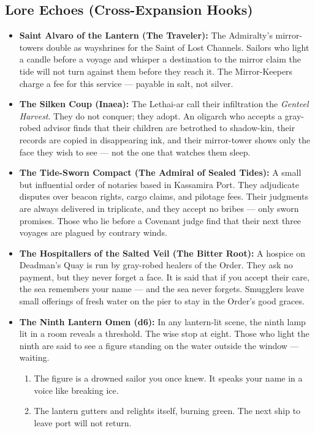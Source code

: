 \subsection*{Lore Echoes (Cross-Expansion Hooks)}
\begin{itemize}
  \item \textbf{Saint Alvaro of the Lantern (The Traveler):} The Admiralty's mirror-towers double as wayshrines for the Saint of Lost Channels. Sailors who light a candle before a voyage and whisper a destination to the mirror claim the tide will not turn against them before they reach it. The Mirror-Keepers charge a fee for this service --- payable in salt, not silver.
  \item \textbf{The Silken Coup (Inaea):} The Lethai-ar call their infiltration the \emph{Genteel Harvest}. They do not conquer; they adopt. An oligarch who accepts a gray-robed advisor finds that their children are betrothed to shadow-kin, their records are copied in disappearing ink, and their mirror-tower shows only the face they wish to see --- not the one that watches them sleep.
  \item \textbf{The Tide-Sworn Compact (The Admiral of Sealed Tides):} A small but influential order of notaries based in Kassamira Port. They adjudicate disputes over beacon rights, cargo claims, and pilotage fees. Their judgments are always delivered in triplicate, and they accept no bribes --- only sworn promises. Those who lie before a Covenant judge find that their next three voyages are plagued by contrary winds.
  \item \textbf{The Hospitallers of the Salted Veil (The Bitter Root):} A hospice on Deadman's Quay is run by gray-robed healers of the Order. They ask no payment, but they never forget a face. It is said that if you accept their care, the sea remembers your name --- and the sea never forgets. Smugglers leave small offerings of fresh water on the pier to stay in the Order's good graces.
  \item \textbf{The Ninth Lantern Omen (d6):} In any lantern-lit scene, the ninth lamp lit in a room reveals a threshold. The wise stop at eight. Those who light the ninth are said to see a figure standing on the water outside the window --- waiting.
    \begin{enumerate}
      \item The figure is a drowned sailor you once knew. It speaks your name in a voice like breaking ice.
      \item The lantern gutters and relights itself, burning green. The next ship to leave port will not return.

\end{enumerate}
\end{itemize}
